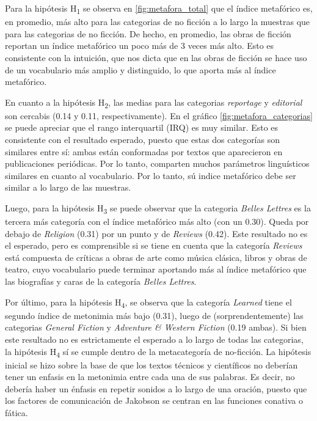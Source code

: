 \documentclass[12pt,letterpaper,twoside]{article}
\begin{document}
Para la hipótesis H\textsubscript{1} se observa en \ref{fig:metafora_total} que el
índice metafórico es, en promedio, más alto para las categorias de no
ficción a lo largo la muestras que para las categorias de no
ficción. De hecho, en promedio, las obras de ficción reportan un
índice metafórico un poco más de 3 veces más alto. Esto es consistente
con la intuición, que nos dicta que en las obras de ficción se hace
uso de un vocabulario más amplio y distinguido, lo que aporta más al
índice metafórico.

En cuanto a la hipótesis H\textsubscript{2}, las medias para las categorias
\emph{reportage} y \emph{editorial} son cercabis (0.14 y 0.11,
respectivamente). En el gráfico \ref{fig:metafora_categorias} se puede
apreciar que el rango interquartil (IRQ) es muy similar. Esto es
consistente con el resultado esperado, puesto que estas dos categorías
son similares entre sí: ambas están conformadas por textos que
aparecieron en publicaciones periódicas. Por lo tanto, comparten
muchos parámetros linguísticos similares en cuanto al vocabulario. Por
lo tanto, sú indice metafórico debe ser similar a lo largo de las
muestras.

Luego, para la hipótesis H\textsubscript{3} se puede observar que la categoria
\emph{Belles Lettres} es la tercera más categoría con el índice metafórico
más alto (con un 0.30). Queda por debajo de \emph{Religion} (0.31) por un
punto y de \emph{Reviews} (0.42). Este resultado no es el esperado, pero es
comprensible si se tiene en cuenta que la categoría \emph{Reviews} está
compuesta de críticas a obras de arte como música clásica, libros y
obras de teatro, cuyo vocabulario puede terminar aportando más al
índice metafórico que las biografías y caras de la categoría \emph{Belles
Lettres}.

Por último, para la hipótesis H\textsubscript{4}, se observa que la categoría
\emph{Learned} tiene el segundo índice de metonimia más bajo (0.31), luego
de (sorprendentemente) las categorias \emph{General Fiction} y \emph{Adventure \&
Western Fiction} (0.19 ambas). Si bien este resultado no es
estrictamente el esperado a lo largo de todas las categorias, la
hipótesis H\textsubscript{4} sí se cumple dentro de la metacategoría de
no-ficción. La hipótesis inicial se hizo sobre la base de que los
textos técnicos y científicos no deberían tener un enfasis en la
metonimia entre cada una de sus palabras.  Es decir, no debería haber
un énfasis en repetir sonidos a lo largo de una oración, puesto que
los factores de comunicación de Jakobson se centran en las funciones
conativa o fática.
\end{document}
